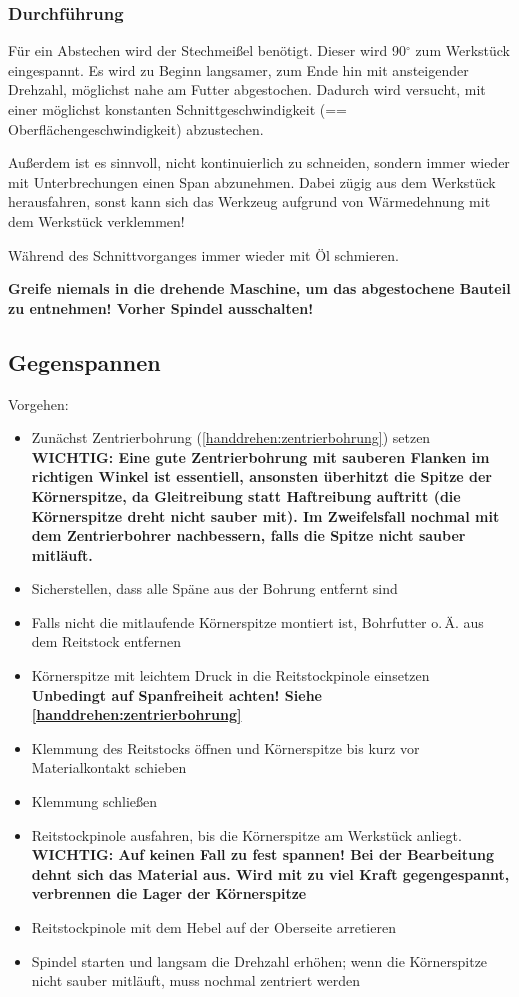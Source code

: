 \documentclass{\basedir/fablab-document}
\begin{document}
\subsubsection{Durchführung}
Für ein Abstechen wird der Stechmeißel benötigt. Dieser wird 90$^\circ$ zum Werkstück eingespannt.
Es wird zu Beginn langsamer, zum Ende hin mit ansteigender Drehzahl, möglichst nahe am Futter abgestochen. Dadurch wird versucht, mit einer möglichst konstanten Schnittgeschwindigkeit (== Oberflächengeschwindigkeit) abzustechen.

Außerdem ist es sinnvoll, nicht kontinuierlich zu schneiden, sondern immer wieder mit Unterbrechungen einen Span abzunehmen.
Dabei zügig aus dem Werkstück herausfahren, sonst kann sich das Werkzeug aufgrund von Wärmedehnung mit dem Werkstück verklemmen!

Während des Schnittvorganges immer wieder mit Öl schmieren.

\textbf{Greife niemals in die drehende Maschine, um das abgestochene Bauteil zu entnehmen! Vorher Spindel ausschalten!}




\subsection{Gegenspannen}
\label{handdrehen:gegenspannen}

Vorgehen:
\begin{itemize}
\item Zunächst Zentrierbohrung (\ref{handdrehen:zentrierbohrung}) setzen\\
	\textbf{WICHTIG: Eine gute Zentrierbohrung mit sauberen Flanken im richtigen Winkel ist essentiell, ansonsten überhitzt die Spitze der Körnerspitze, da Gleitreibung statt Haftreibung auftritt (die Körnerspitze dreht nicht sauber mit). Im Zweifelsfall nochmal mit dem Zentrierbohrer nachbessern, falls die Spitze nicht sauber mitläuft.} 
\item Sicherstellen, dass alle Späne aus der Bohrung entfernt sind
\item Falls nicht die mitlaufende Körnerspitze montiert ist, Bohrfutter o.\,Ä. aus dem Reitstock entfernen
\item Körnerspitze mit leichtem Druck in die Reitstockpinole einsetzen\\
\textbf{Unbedingt auf Spanfreiheit achten! Siehe \ref{handdrehen:zentrierbohrung}}
\item Klemmung des Reitstocks öffnen und Körnerspitze bis kurz vor Materialkontakt schieben 
\item Klemmung schließen
\item Reitstockpinole ausfahren, bis die Körnerspitze am Werkstück anliegt.\\
\textbf{WICHTIG: Auf keinen Fall zu fest spannen! Bei der Bearbeitung dehnt sich das Material aus. Wird mit zu viel Kraft gegengespannt, verbrennen die Lager der Körnerspitze}
\item Reitstockpinole mit dem Hebel auf der Oberseite arretieren
\item Spindel starten und langsam die Drehzahl erhöhen; wenn die Körnerspitze nicht sauber mitläuft, muss nochmal zentriert werden
\end{itemize}
\end{document}
